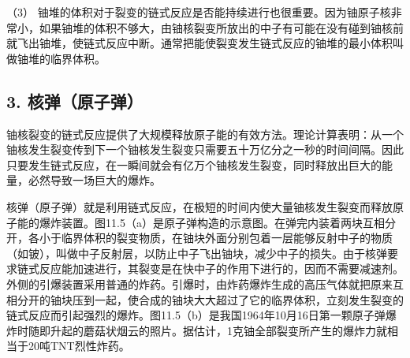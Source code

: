 （3）
铀堆的体积对于裂变的链式反应是否能持续进行也很重要。因为铀原子核非常小，如果铀堆的体积不够大，由铀核裂变所放出的中子有可能在没有碰到铀核前就飞出铀堆，使链式反应中断。通常把能使裂变发生链式反应的铀堆的最小体积叫做铀堆的临界体积。

\subsection{3. 核弹（原子弹）}

铀核裂变的链式反应提供了大规模释放原子能的有效方法。理论计算表明：从一个铀核发生裂变传到下一个铀核发生裂变只需要五十万亿分之一秒的时间间隔。因此只要发生链式反应，在一瞬间就会有亿万个铀核发生裂变，同时释放出巨大的能量，必然导致一场巨大的爆炸。

核弹（原子弹）就是利用链式反应，在极短的时间内使大量铀核发生裂变而释放原子能的爆炸装置。图11.5（a）是原子弹构造的示意图。在弹完内装着两块互相分开，各小于临界体积的裂变物质，在铀块外面分别包着一层能够反射中子的物质（如铍），叫做中子反射层，以防止中子飞出铀块，减少中子的损失。由于核弹要求链式反应能加速进行，其裂变是在快中子的作用下进行的，因而不需要减速剂。外侧的引爆装置采用普通的炸药。引爆时，由炸药爆炸生成的高压气体就把原来互相分开的铀块压到一起，使合成的铀块大大超过了它的临界体积，立刻发生裂变的链式反应而引起强烈的爆炸。图11.5（b）是我国1964年10月16日第一颗原子弹爆炸时随即升起的蘑菇状烟云的照片。据估计，1克铀全部裂变所产生的爆炸力就相当于20吨TNT烈性炸药。

